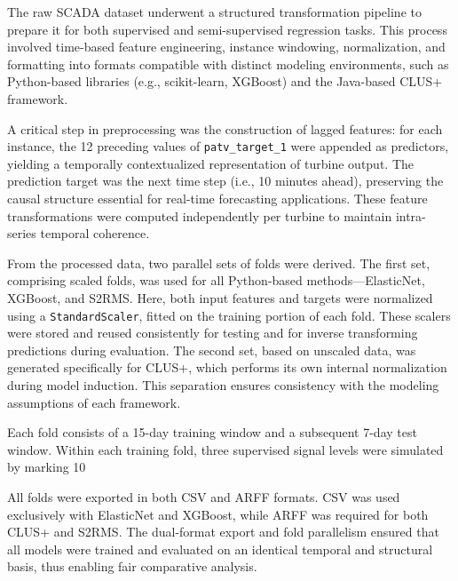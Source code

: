 The raw SCADA dataset underwent a structured transformation pipeline to prepare it for both supervised and semi-supervised regression tasks. This process involved time-based feature engineering, instance windowing, normalization, and formatting into formats compatible with distinct modeling environments, such as Python-based libraries (e.g., scikit-learn, XGBoost) and the Java-based CLUS+ framework.

A critical step in preprocessing was the construction of lagged features: for each instance, the 12 preceding values of \texttt{patv\_target\_1} were appended as predictors, yielding a temporally contextualized representation of turbine output. The prediction target was the next time step (i.e., 10 minutes ahead), preserving the causal structure essential for real-time forecasting applications. These feature transformations were computed independently per turbine to maintain intra-series temporal coherence.

From the processed data, two parallel sets of folds were derived. The first set, comprising scaled folds, was used for all Python-based methods—ElasticNet, XGBoost, and S2RMS. Here, both input features and targets were normalized using a \texttt{StandardScaler}, fitted on the training portion of each fold. These scalers were stored and reused consistently for testing and for inverse transforming predictions during evaluation. The second set, based on unscaled data, was generated specifically for CLUS+, which performs its own internal normalization during model induction. This separation ensures consistency with the modeling assumptions of each framework.

Each fold consists of a 15-day training window and a subsequent 7-day test window. Within each training fold, three supervised signal levels were simulated by marking 10%

All folds were exported in both CSV and ARFF formats. CSV was used exclusively with ElasticNet and XGBoost, while ARFF was required for both CLUS+ and S2RMS. The dual-format export and fold parallelism ensured that all models were trained and evaluated on an identical temporal and structural basis, thus enabling fair comparative analysis.
